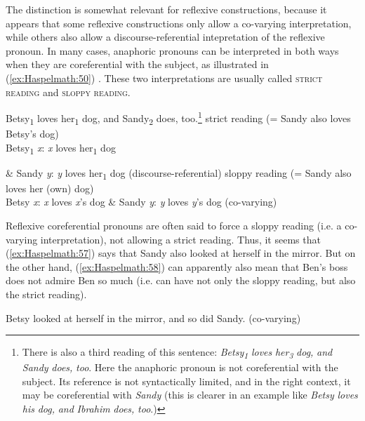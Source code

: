 \documentclass[output=paper]{langscibook}
\begin{document}
  The distinction is somewhat relevant for reflexive constructions, because it appears that some reflexive constructions only allow a co-varying interpretation, while others also allow a discourse-referential intepretation of the reflexive pronoun. In many cases, anaphoric pronouns can be interpreted in both ways when they are coreferential with the subject, as illustrated in (\ref{ex:Haspelmath:50}) \citep[127--128]{Sag1976}. These two interpretations are usually called \textsc{strict} \textsc{reading} and \textsc{sloppy} \textsc{reading}.

\ea%
    \label{ex:Haspelmath:56}
    {Betsy\textsubscript{1}} {loves} {her\textsubscript{1}} {dog,} {and} {Sandy\textsubscript{2}} {does,} {too.}\footnote{ {There is also a third reading of this sentence:} {\textit{Betsy}}{\textit{\textsubscript{1}}}{ \textit{loves} \textit{her}}{\textit{\textsubscript{3}}}{ \textit{dog,} \textit{and} \textit{Sandy} \textit{does,} \textit{too}}{. Here the anaphoric pronoun is not coreferential with the subject. Its reference is not syntactically limited, and in the right context, it may be coreferential with} {\textit{Sandy}} {(this is clearer in an example like} {\textit{Betsy} \textit{loves} \textit{his} \textit{dog,} \textit{and} \textit{Ibrahim} \textit{does,} \textit{too}}.)}
    \ea strict reading  (= Sandy also loves Betsy’s dog)\\
     Betsy\textsubscript{1} \textit{x}:   \textit{x} loves her\textsubscript{1} dog

    \& Sandy \textit{y}:  \textit{y} loves her\textsubscript{1} dog  (discourse-referential)
   \ex  sloppy reading (= Sandy also loves her (own) dog)  \\
   Betsy \textit{x}:   \textit{x} loves \textit{x}’s dog \& Sandy \textit{y}:  \textit{y} loves \textit{y}’s dog    (co-varying)
    \z
\z           

Reflexive coreferential pronouns are often said to force a sloppy reading (i.e. a co-varying interpretation), not allowing a strict reading. Thus, it seems that (\ref{ex:Haspelmath:57}) says that Sandy also looked at herself in the mirror. But on the other hand, (\ref{ex:Haspelmath:58}) can apparently also mean that Ben’s boss does not admire Ben so much (i.e. can have not only the sloppy reading, but also the strict reading).

\ea%
    \label{ex:Haspelmath:57}
    {Betsy} {looked} {at} {herself} {in} {the} {mirror,} {and} {so} {did} {Sandy.} (co-varying) 
\z

          
\end{document}
